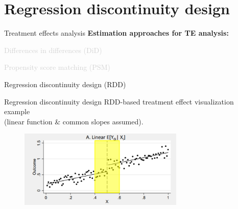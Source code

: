 \documentclass{beamer}
\begin{document}
\section{Regression discontinuity design}
\begin{frame}{Treatment effects analysis}
\textbf{Estimation approaches for TE analysis:}\\
\bigskip
\begin{enumerate}
    \item \textcolor{lightgray}{Differences in differences (DiD)
    \bigskip
    \item Propensity score matching (PSM)}
    \bigskip
    \item Regression discontinuity design (RDD)
\end{enumerate}
\end{frame}
\begin{frame}{Regression discontinuity design}
\centering
RDD-based treatment effect visualization example \\(linear function \& common slopes assumed).

\begin{figure}
    \includegraphics[trim = 0cm 0cm 0cm 0.65cm, clip,width=0.7\textwidth]{./IMG/RDD1.jpg}
    \label{fig:my_label}
\end{figure}    
\end{frame}
\end{document}
